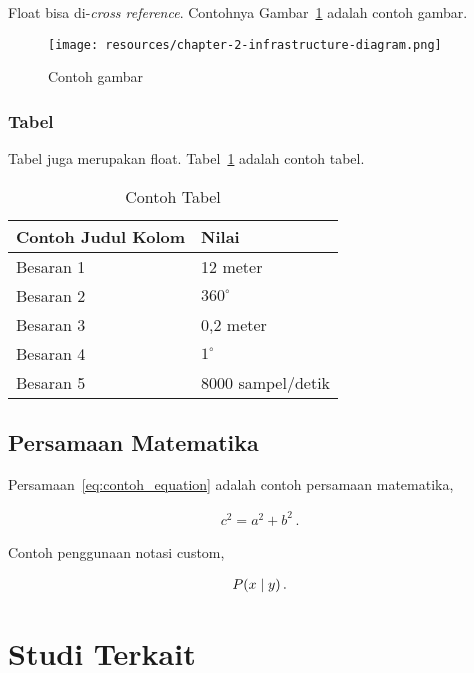     Float bisa di-\textit{cross reference}. Contohnya Gambar~\ref{fig:contoh_gambar} adalah contoh gambar.

    \begin{figure}[h]
        \centering
        \texttt{[image: resources/chapter-2-infrastructure-diagram.png]}
        \caption{Contoh gambar}
        \label{fig:contoh_gambar}
    \end{figure}

    \subsubsection{Tabel}

    Tabel juga merupakan float. Tabel~\ref{table:contoh_tabel} adalah contoh tabel.

    \begin{table}[htbp]
        \small
        \centering
        \caption{Contoh Tabel}
        \label{table:contoh_tabel}
        \begin{tabular}{ll}
            \toprule
            \multicolumn{1}{l}{\textbf{Contoh Judul Kolom}} & \multicolumn{1}{l}{\textbf{Nilai}}\\
            \midrule
            Besaran 1 & 12 meter          \\
            Besaran 2 & $360^\circ$       \\
            Besaran 3 & 0,2 meter         \\
            Besaran 4 & $1^\circ$         \\
            Besaran 5 & 8000 sampel/detik \\
            \bottomrule
        \end{tabular}
    \end{table}

    \subsection{Persamaan Matematika}

    \blindtext Persamaan~\eqref{eq:contoh_equation} adalah contoh persamaan matematika,

    \begin{align}
        c^2 = a^2 + b^2\,.
    \label{eq:contoh_equation}
    \end{align}
    
    Contoh penggunaan notasi custom,
    
    \begin{align}
        P(x \mid y)\,.
    \label{eq:contoh_equation_custom}
    \end{align}

\section{Studi Terkait}
\blindtext
